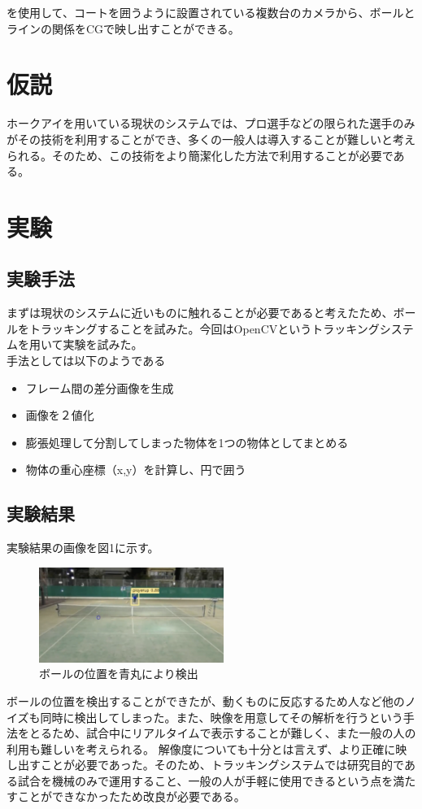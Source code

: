 \documentclass[a4j,10pt]{jsarticle}
\begin{document}
を使用して、コートを囲うように設置されている複数台のカメラから、ボールとラインの関係をCGで映し出すことができる。

\section{仮説}
ホークアイを用いている現状のシステムでは、プロ選手などの限られた選手のみがその技術を利用することができ、多くの一般人は導入することが難しいと考えられる。そのため、この技術をより簡潔化した方法で利用することが必要である。
\section{実験}
\subsection{実験手法}
まずは現状のシステムに近いものに触れることが必要であると考えたため、ボールをトラッキングすることを試みた。今回はOpenCVというトラッキングシステムを用いて実験を試みた。
\\手法としては以下のようである
\begin{itemize}
\item フレーム間の差分画像を生成
\item 画像を２値化
\item 膨張処理して分割してしまった物体を1つの物体としてまとめる
\item 物体の重心座標（x,y）を計算し、円で囲う
\end{itemize}

\subsection{実験結果}

実験結果の画像を図1に示す。

\begin{figure}[htbp]
    \begin{center}
        \includegraphics[width=6cm]{figure.png}
        \caption{ボールの位置を青丸により検出}
        \label{sample}
    \end{center}
\end{figure}
ボールの位置を検出することができたが、動くものに反応するため人など他のノイズも同時に検出してしまった。また、映像を用意してその解析を行うという手法をとるため、試合中にリアルタイムで表示することが難しく、また一般の人の利用も難しいを考えられる。
解像度についても十分とは言えず、より正確に映し出すことが必要であった。そのため、トラッキングシステムでは研究目的である試合を機械のみで運用すること、一般の人が手軽に使用できるという点を満たすことができなかったため改良が必要である。
\end{document}
